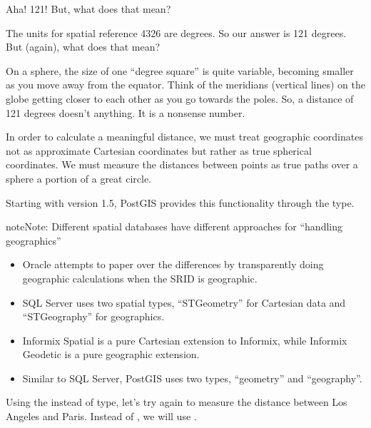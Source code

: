 \documentclass[a4paper,11pt,english]{sphinxmanual}
\begin{document}
\begin{sphinxVerbatim}[commandchars=\\\{\}]
\end{sphinxVerbatim}

Aha! 121! But, what does that mean?

The units for spatial reference 4326 are degrees. So our answer is 121 degrees. But (again), what does that mean?

On a sphere, the size of one “degree square” is quite variable, becoming smaller as you move away from the equator. Think of the meridians (vertical lines) on the globe getting closer to each other as you go towards the poles. So, a distance of 121 degrees doesn’t  anything. It is a nonsense number.

In order to calculate a meaningful distance, we must treat geographic coordinates not as approximate Cartesian coordinates but rather as true spherical coordinates.  We must measure the distances between points as true paths over a sphere \textendash{} a portion of a great circle.

Starting with version 1.5, PostGIS provides this functionality through the  type.

\begin{sphinxadmonition}{note}{Note:}
Different spatial databases have different approaches for “handling geographics”
\begin{itemize}
\item {} 
Oracle attempts to paper over the differences by transparently doing geographic calculations when the SRID is geographic.

\item {} 
SQL Server uses two spatial types, “STGeometry” for Cartesian data and “STGeography” for geographics.

\item {} 
Informix Spatial is a pure Cartesian extension to Informix, while Informix Geodetic is a pure geographic extension.

\item {} 
Similar to SQL Server, PostGIS uses two types, “geometry” and “geography”.

\end{itemize}
\end{sphinxadmonition}

Using the  instead of  type, let’s try again to measure the distance between Los Angeles and Paris. Instead of , we will use .
\end{document}
